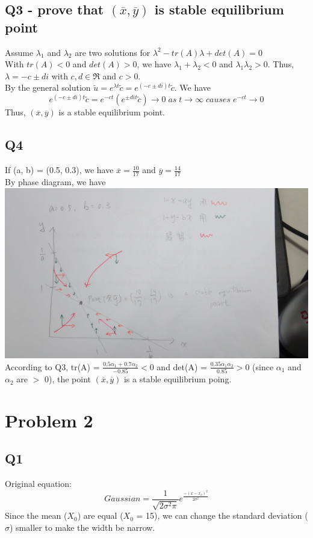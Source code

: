 \documentclass [12pt] {article}
\begin{document}
	\subsection {Q3 - prove that $(\overline{x}, \overline{y})$ is stable equilibrium point}
	Assume $\lambda_1$ and $\lambda_2$ are two solutions for $\lambda^2 - tr(A)\lambda+det(A) = 0$\\
	With $tr(A) < 0$ and $det(A) > 0$, we have $\lambda_1+\lambda_2 < 0$ and $\lambda_1\lambda_2 > 0$. Thus, $\lambda = -c \pm di$ with $c, d \in \Re$ and $c > 0.$\\
	By the general solution $\widetilde{u} = e^{\lambda t}\widetilde{c} = e^{(-c\pm di)t}\widetilde{c}$. We have
	\[e^{(-c\pm di)t}\widetilde{c} = e^{-ct}(e^{\pm dit}\widetilde{c}) \rightarrow 0 \;as \;t \rightarrow \infty \;causes \;e^{-ct}\rightarrow 0\]
	Thus, $(\overline{x}, \overline{y})$ is a stable equilibrium point.
	\subsection {Q4}
	If (a, b) = (0.5, 0.3), we have $\overline{x} = \frac{10}{17}$ and $\overline{y} = \frac{14}{17}$\\
	By phase diagram, we have\\
	\includegraphics [width=\linewidth]{fig1}
	According to Q3, tr(A) = $\frac{0.5\alpha_1+0.7\alpha_2}{-0.85} < 0$ and det(A) = $\frac{0.35\alpha_1\alpha_2}{0.85} > 0$ (since $\alpha_1$ and $\alpha_2$ are $>$ 0), the point $(\overline{x}, \overline{y})$ is a stable equilibrium poing.

	\section {Problem 2}
	\subsection {Q1}
	Original equation:
	\[Gaussian = \frac{1}{\sqrt{2\sigma^2\pi}}e^{\frac{-(x-x_o)^2}{2\sigma^2}}\]
	Since the mean ($X_0$) are equal ($X_0$ = 15), we can change the standard deviation ($\sigma$) smaller to make the width be narrow.
\end{document}
